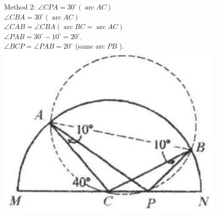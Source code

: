 \documentclass{article}
\begin{document}
Method 2:
\(\angle C P A=30^{\circ}(\operatorname{arc} A C)\)\\
\(\angle C B A=30^{\circ}(\operatorname{arc} A C)\)\\
\(\angle C A B=\angle C B A(\operatorname{arc} B C=\operatorname{arc} A C)\)\\
\(\angle P A B=30^{\circ}-10^{\circ}=20^{\circ}\).\\
\(\angle B C P=\angle P A B=20^{\circ}\) (same arc \(P B\) ).\\
\centering
\includegraphics[width=\textwidth]{images/reasoning_image_1.jpg}
\end{document}
